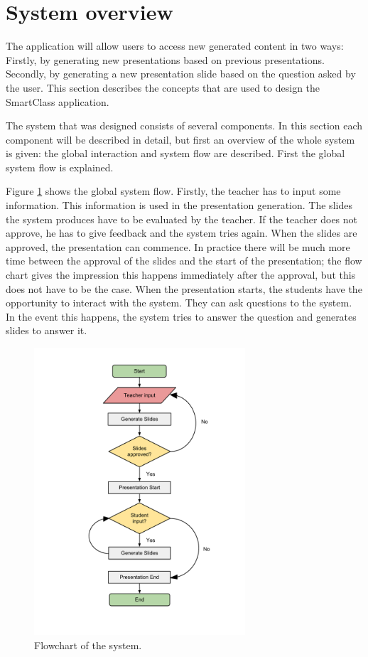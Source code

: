 \documentclass[11pt]{article}
\begin{document}
\section{System overview}
The application will allow users to access new generated content in two ways: Firstly, by generating new presentations based on previous presentations. Secondly, by generating a new presentation slide based on the question asked by the user. This section describes the concepts that are used to design the SmartClass application.

The system that was designed consists of several components. In this section each component will be described in detail, but first an overview of the whole system is given: the global interaction and system flow are described. First the global system flow is explained.

Figure \ref{flowchart} shows the global system flow. Firstly, the teacher has to input some information. This information is used in the presentation generation. The slides the system produces have to be evaluated by the teacher. If the teacher does not approve, he has to give feedback and the system tries again.
When the slides are approved, the presentation can commence. In practice there will be much more time between the approval of the slides and the start of the presentation; the flow chart gives the impression this happens immediately after the approval, but this does not have to be the case.
When the presentation starts, the students have the opportunity to interact with the system. They can ask questions to the system. In the event this happens, the system tries to answer the question and generates slides to answer it.

\begin{figure}[!h]
\centering
\includegraphics[width=0.7\textwidth]{KBMSFlowchartnew.pdf}
\caption{Flowchart of the system.}
\label{flowchart}
\end{figure}
\end{document}
